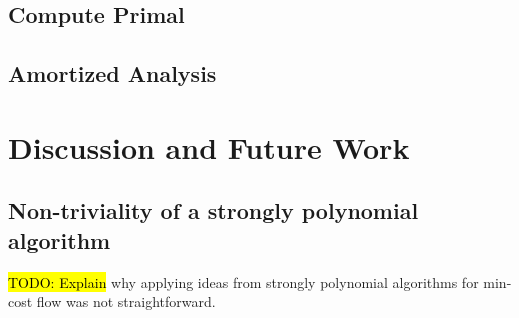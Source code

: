 \documentclass[11pt]{article}
\theoremstyle{definition}
\theoremstyle{definition}
\newcommand{\todo}[1]{\hl{TODO: #1}}
\begin{document}
	\subsection{Compute Primal}
	\subsection{Amortized Analysis}


\section{Discussion and Future Work}

	\subsection{Non-triviality of a strongly polynomial algorithm}

	\todo{Explain} why applying ideas from strongly polynomial algorithms for
	min-cost flow was not straightforward. 



\setlength{\bibitemsep}{0pt}
\nocite{*}
\printbibliography
\end{document}
